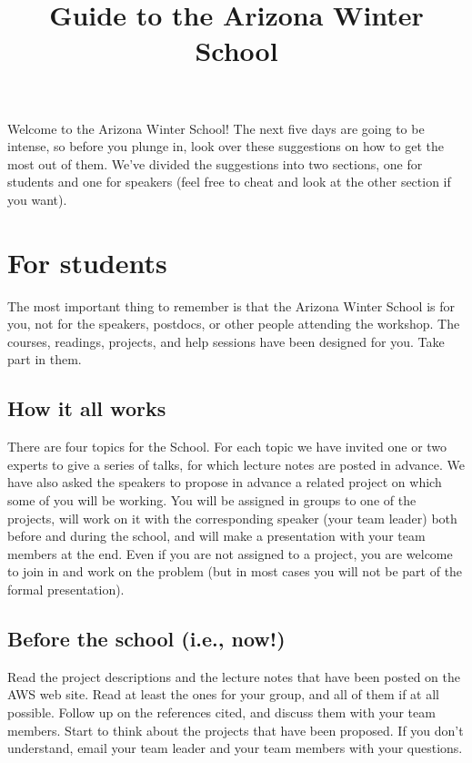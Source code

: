 \documentclass{article}
\title{Guide to the Arizona Winter School}
\date{}
\begin{document}
\maketitle


Welcome to the Arizona Winter School! The next five days are going to
be intense, so before you plunge in, look over these suggestions on
how to get the most out of them. We've divided the suggestions into
two sections, one for students and one for speakers (feel free to
cheat and look at the other section if you want).


\section{For students}
\label{sec:students}


The most important thing to remember is that the Arizona Winter School
is for you, not for the speakers, postdocs, or other people attending
the workshop. The courses, readings, projects, and help sessions have
been designed for you. Take part in them.


\subsection{How it all works}
\label{sec:how-it-all}

There are four topics for the School. For each topic we have invited
one or two experts to give a series of talks, for which lecture notes
are posted in advance. We have also asked the speakers  to
propose in advance a related project on which some of you will be
working. You
will be assigned in groups to one of the projects, will work on it
with the corresponding speaker (your team leader)
both before and during the school, and will make a presentation with
your team members at the end.  Even if you are not assigned to a project, you are welcome to join in and work on the problem (but in most cases you will not be part of the formal presentation). 

\subsection{Before the school (i.e., now!)}
\label{sec:readings}

Read the project descriptions and the lecture notes that have been
posted on the AWS web site. Read at least the ones for your group, and
all of them if at all possible. Follow up on the references cited, and discuss
them with your team  members. Start to think about the projects
that have been proposed. If you don't understand, email your team
leader and your team members with your
questions.
\end{document}
